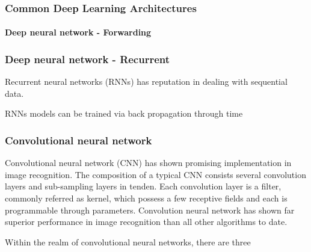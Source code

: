 \subsubsection{Common Deep Learning Architectures}

\paragraph{Deep neural network - Forwarding}
\subsubsection{Deep neural network - Recurrent}
Recurrent neural networks (RNNs) has reputation in dealing with sequential data. 

RNNs models can be trained via back propagation through time~\cite{Goodfellow-et-al-2016} 

\subsubsection{Convolutional neural network}
Convolutional neural network (CNN) has shown promising implementation in image recognition. The composition of a typical CNN consists several convolution layers and sub-sampling layers in tenden. Each convolution layer is a filter, commonly referred as kernel, which possess a few receptive fields and each is programmable through parameters.  
Convolution neural network has shown far superior performance in image recognition than all other algorithms to date.~\cite{Szegedy_2015}
\par 
Within the realm of convolutional neural networks, there are three